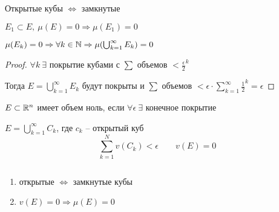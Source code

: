     \begin{remark}
        Открытые кубы $\Leftrightarrow$ замкнутые
    \end{remark}
    \begin{remark}
        $E_1 \subset E, \ \mu(E) = 0 \Rightarrow \mu(E_1) = 0$
    \end{remark}

    \begin{lemma}
        $\mu(E_k) = 0 \Rightarrow \forall k \in \mathbb{N} \Rightarrow \mu(\bigcup_{k=1}^\infty E_k) = 0$
    \end{lemma}

    \begin{proof}
        $\forall k \ \exists$ покрытие кубами с $\sum$ объемов $ < \frac \epsilon 2^k$
        \par Тогда $E = \bigcup_{k=1}^\infty E_k$ будут покрыты и $\sum$ объемов $< \epsilon \cdot \sum_{k=1}^\infty \frac 1 2^k = \epsilon$
    \end{proof}

    \begin{definition}
        $E \subset \mathbb{R}^n$ имеет объем ноль, если $\forall \epsilon \ \exists$ конечное покрытие
        \par $E = \bigcup_{k=1}^\infty C_k$, где $c_k$ -- открытый куб
        \[
            \sum_{k=1}^N v(C_k) < \epsilon \quad \quad v(E) = 0   
        \]
    \end{definition}

    \begin{remark}
        $ $
        \begin{enumerate}
            \item открытые $\Leftrightarrow$ замкнутые кубы
            \item $v(E) = 0 \Rightarrow \mu(E) = 0$
        \end{enumerate}
    \end{remark}

